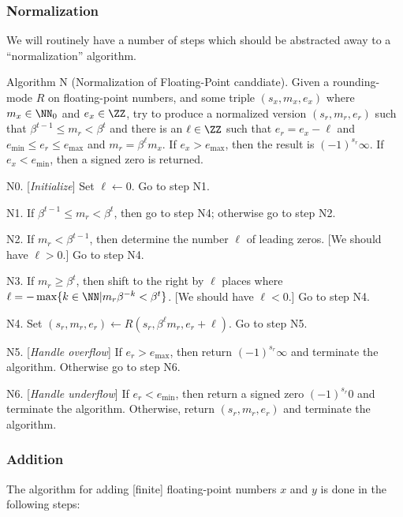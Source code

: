 \subsubsection{Normalization}

We will routinely have a number of steps which should be abstracted away
to a ``normalization'' algorithm.

\algbegin Algorithm N (Normalization of Floating-Point canddiate). Given
a rounding-mode $R$ on floating-point numbers, and
some triple $(s_{x}, m_{x}, e_{x})$ where $m_{x}\in\NN_{0}$ and
$e_{x}\in\ZZ$, try to produce a normalized version $(s_{r}, m_{r}, e_{r})$
such that $\beta^{t-1}\leq m_{r}<\beta^{t}$ and there is an $\ell\in\ZZ$
such that $e_{r}=e_{x}-\ell$ and $e_{\text{min}}\leq e_{r}\leq e_{\text{max}}$
and $m_{r} = \beta^{\ell}m_{x}$. If $e_{x}> e_{\text{max}}$, then the
result is $(-1)^{s_{r}}\infty$. If $e_{x} < e_{\text{min}}$, then a
signed zero is returned.

\algstep N0. [{\it Initialize\/}] Set $\ell\gets0$. Go to step N1.

\algstep N1. If $\beta^{t-1}\leq m_{r}<\beta^{t}$, then go to step N4;
otherwise go to step N2.

\algstep N2. If $m_{r} < \beta^{t-1}$, then determine the number $\ell$
of leading zeros. [We should have $\ell>0$.] Go to step N4.

\algstep N3. If $m_{r} \geq \beta^{t}$, then shift to the right by
$\ell$ places where $\ell = -\max\{k\in\NN | m_{r}\beta^{-k}<\beta^{t}\}$.
[We should have $\ell < 0$.]
Go to step N4.

\algstep N4. Set $(s_{r},m_{r},e_{r})\gets R(s_{r},\beta^{\ell}m_{r},e_{r}+\ell)$.
Go to step N5.

\algstep N5. [{\it Handle overflow\/}] If $e_{r}>e_{\text{max}}$, then
return $(-1)^{s_{r}}\infty$ and terminate the algorithm. Otherwise go to
step N6.

\algstep N6. [{\it Handle underflow\/}] If $e_{r}<e_{\text{min}}$, then
return a signed zero $(-1)^{s_{r}}0$ and terminate the
algorithm. Otherwise, return $(s_{r},m_{r},e_{r})$ and terminate the algorithm.\quad\slug

\subsubsection{Addition}

The algorithm for adding [finite] floating-point numbers $x$ and $y$ is
done in the following steps:

